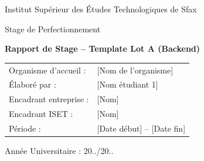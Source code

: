 \begin{titlepage}
\centering
{\Large Institut Supérieur des Études Technologiques de Sfax\par}
\vspace{0.8cm}
{\large Stage de Perfectionnement\par}
\vspace{1.2cm}
{\LARGE \textbf{Rapport de Stage -- Template Lot A (Backend)}\par}
\vspace{1.2cm}
\begin{tabular}{ll}
Organisme d'accueil : & [Nom de l'organisme] \\
Élaboré par : & [Nom étudiant 1] \\
Encadrant entreprise : & [Nom] \\
Encadrant ISET : & [Nom] \\
Période : & [Date début] -- [Date fin]
\end{tabular}
\vfill
Année Universitaire : 20../20..
\end{titlepage}
